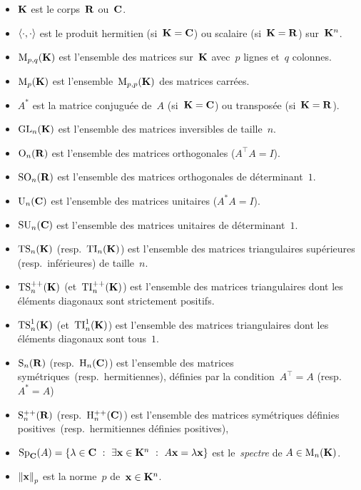 \begin{itemize}
	\item $\mathbf{K}$ est le corps~$\mathbf{R}$ ou~$\mathbf{C}$.
	\item $\left\langle \cdot,\cdot\right\rangle$ est le produit hermitien
		(si~$\mathbf{K}=\mathbf{C}$) ou scalaire (si~$\mathbf{K}=\mathbf{R}$) sur~$\mathbf{K}^n$.
	\item $\mathrm{M}_{p,q}(\mathbf{K})$ est l'ensemble des matrices sur~$\mathbf{K}$
		avec~$p$ lignes et~$q$ colonnes.
	\item $\mathrm{M}_p(\mathbf{K})$ est l'ensemble~$\mathrm{M}_{p,p}(\mathbf{K})$ des matrices carrées.
	\item $A^*$ est la matrice conjuguée de~$A$ (si~$\mathbf{K}=\mathbf{C}$) ou transposée
		(si~$\mathbf{K}=\mathbf{R}$).
	\item $\mathrm{GL}_n(\mathbf{K})$ est
		l'ensemble des matrices inversibles de taille~$n$.
	\item $\mathrm{O}_n(\mathbf{R})$ est 
		l'ensemble des matrices orthogonales ($A^\top A=I$).
	\item $\mathrm{SO}_n(\mathbf{R})$ est
		l'ensemble des matrices orthogonales de déterminant~$1$.
	\item $\mathrm{U}_n(\mathbf{C})$ est
		l'ensemble des matrices unitaires ($A^*A=I$).
	\item $\mathrm{SU}_n(\mathbf{C})$ est
		l'ensemble des matrices unitaires de déterminant~$1$.
	\item $\mathrm{TS}_n(\mathbf{K})$ (resp.~$\mathrm{TI}_n(\mathbf{K})$) est l'ensemble des matrices
		triangulaires supérieures (resp.~inférieures) de taille~$n$.
	\item $\mathrm{TS}^{++}_n(\mathbf{K})$ (et~$\mathrm{TI}^{++}_n(\mathbf{K})$) est l'ensemble des matrices
		triangulaires dont les éléments diagonaux sont strictement positifs.
	\item $\mathrm{TS}^{1}_n(\mathbf{K})$ (et~$\mathrm{TI}^{1}_n(\mathbf{K})$) est l'ensemble des matrices
		triangulaires dont les éléments diagonaux sont tous~$1$.
	\item $\mathrm{S}_n(\mathbf{R})$ (resp.~$\mathrm{H}_n(\mathbf{C})$) est l'ensemble des matrices
			symétriques~(resp.~hermitiennes), définies par la
			condition~$A^\top=A$ (resp.~$A^*=A$)
	\item $\mathrm{S}^{++}_n(\mathbf{R})$ (resp.~$\mathrm{H}^{++}_n(\mathbf{C})$) est l'ensemble des matrices
			symétriques définies positives~(resp.~hermitiennes définies positives),
		\item $\Sp_\C(A)=\left\{\lambda\in\C\ :\ \exists\x\in\K^n\ :\
			A\x=\lambda\x\right\}$ est le~\emph{spectre} de
			$A\in\mathrm{M}_n(\mathbf{K})$.
	\item $\left\|\mathbf{x}\right\|_p$ est la norme~$p$ de~$\mathbf{x}\in\mathbf{K}^n$.
\end{itemize}


